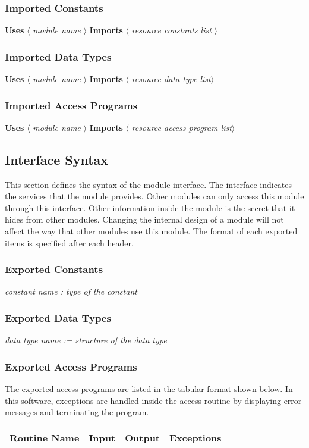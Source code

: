 \documentclass[12pt,titlepage]{article}
\begin{document}
\subsubsection{Imported Constants}
{\bf Uses} $\langle$ \emph{module name} $\rangle$ {\bf Imports} $\langle$ \emph{resource constants list} $\rangle$ 

\subsubsection{Imported Data Types}
{\bf Uses} $\langle$ \emph{module name} $\rangle$ {\bf Imports} $\langle$ \emph{resource data type list}$\rangle$

\subsubsection{Imported Access Programs}
{\bf Uses} $\langle$ \emph{module name} $\rangle$ {\bf Imports} $\langle$ \emph{resource access program list}$\rangle$

\subsection{Interface Syntax}
This section defines the syntax of the module interface. The interface indicates the services that the module provides. Other modules can only access this module through this interface. Other information inside the module is the secret that it hides from other modules. Changing the internal design of a module will not affect the way that other modules use this module. The format of each exported items is specified after each header. 

\subsubsection{Exported Constants}
 \emph{constant name : type of the constant}
 
\subsubsection{Exported Data Types}
 \emph{data type name := structure of the data type}
 
\subsubsection{Exported Access Programs}
The exported access programs are listed in the tabular format shown below. In this software, exceptions are handled inside the access routine by displaying error messages and terminating the program.
\begin{table}[htbp]
\centering
\begin{tabular}{|c|c|c|c|}
\hline
Routine Name & Input & Output & Exceptions \\ 
\hline
\end{tabular}
\end{table}
\end{document}

